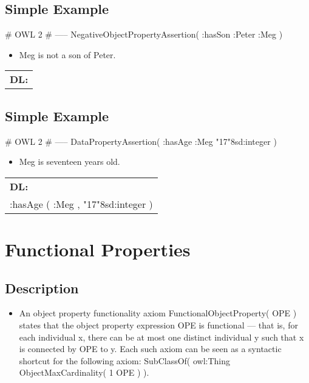 \documentclass{llncs}
\newenvironment{DL}{
  \scriptsize
  \sffamily
  \vspace{0.3cm}
  \begin{tabular}{l}
	\textbf{DL:} \\

}{
  \end{tabular}
  \linebreak
}
\newcommand{\tb}[1]{\todo[size=\small, color=blue!40]{\textbf{Thomas:} #1}}
\begin{document}
\subsection{Simple Example}

\begin{ex}
# OWL 2
# -----
NegativeObjectPropertyAssertion( :hasSon :Peter :Meg )
\end{ex}

\begin{itemize}
	\item Meg is not a son of Peter.
\end{itemize}

\begin{DL}

\end{DL}

\tb{ToDo: DL}

\subsection{Simple Example}

\begin{ex}
# OWL 2
# -----
DataPropertyAssertion( :hasAge :Meg "17"^^xsd:integer )
\end{ex}

\begin{itemize}
	\item Meg is seventeen years old. 
\end{itemize}

\begin{DL}
:hasAge ( :Meg , "17"^^xsd:integer ) \\
\end{DL}

\section{Functional Properties}

\subsection{Description}

\begin{itemize}
	\item An object property functionality axiom FunctionalObjectProperty( OPE ) states that the object property expression OPE is functional — that is, for each individual x, there can be at most one distinct individual y such that x is connected by OPE to y. Each such axiom can be seen as a syntactic shortcut for the following axiom: SubClassOf( owl:Thing ObjectMaxCardinality( 1 OPE ) ).
\end{itemize}
\end{document}
